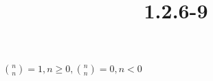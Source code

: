 \documentclass{article}
\title{1.2.6-9}
\begin{document}
\maketitle

\( \binom{n}{n} = 1, n \geq 0, \binom{n}{n} = 0, n < 0 \)
\end{document}
